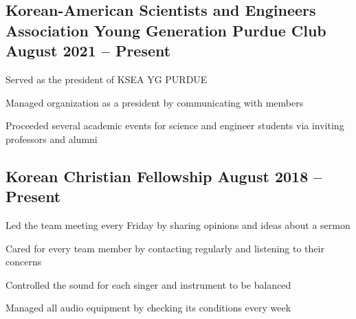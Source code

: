 \documentclass[letter,10pt]{article}
\begin{document}
\subsection{{ Korean-American Scientists and Engineers Association Young Generation Purdue Club \hfill August 2021 – Present}}
\begin{zitemize}
\item Served as the president of KSEA YG PURDUE
\item Managed organization as a president by communicating with members
\item Proceeded several academic events for science and engineer students via inviting professors and alumni

\end{zitemize}

\subsection{{ Korean Christian Fellowship \hfill August 2018 – Present}}
\begin{zitemize}
\item Led the team meeting every Friday by sharing opinions and ideas about a sermon 
\item Cared for every team member by contacting regularly and listening to their concerns

\end{zitemize}
\begin{zitemize}
\item Controlled the sound for each singer and instrument to be balanced
\item Managed all audio equipment by checking its conditions every week

\end{zitemize}
\end{document}
